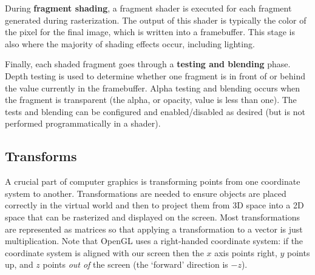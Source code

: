During \textbf{fragment shading}, a fragment shader is executed for each fragment generated during rasterization. The output of this shader is typically the color of the pixel for the final image, which is written into a framebuffer. This stage is also where the majority of shading effects occur, including lighting.

Finally, each shaded fragment goes through a \textbf{testing and blending} phase. Depth testing is used to determine whether one fragment is in front of or behind the value currently in the framebuffer. Alpha testing and blending occurs when the fragment is transparent (the alpha, or opacity, value is less than one). The tests and blending can be configured and enabled/disabled as desired (but is not performed programmatically in a shader).

\subsection{Transforms}
A crucial part of computer graphics is transforming points from one coordinate system to another. Transformations are needed to ensure objects are placed correctly in the virtual world and then to project them from 3D space into a 2D space that can be rasterized and displayed on the screen. Most transformations are represented as matrices so that applying a transformation to a vector is just multiplication. Note that OpenGL uses a right-handed coordinate system: if the coordinate system is aligned with our screen then the $x$ axis points right, $y$ points up, and $z$ points \textit{out of} the screen (the `forward' direction is $-z$).

